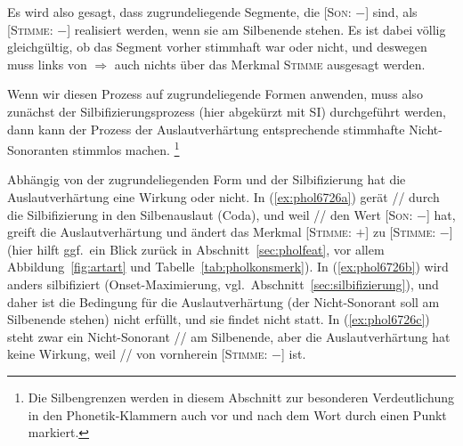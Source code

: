 
Es wird also gesagt, dass zugrundeliegende Segmente, die [\textsc{Son}: $-$] sind, als [\textsc{Stimme}: $-$] realisiert werden, wenn sie am Silbenende stehen.
Es ist dabei völlig gleichgültig, ob das Segment vorher stimmhaft war oder nicht, und deswegen muss links von $\Rightarrow$ auch nichts über das Merkmal \textsc{Stimme} ausgesagt werden.

Wenn wir diesen Prozess auf zugrundeliegende Formen anwenden, muss also zunächst der Silbifizierungsprozess (hier abgekürzt mit SI) durchgeführt werden, dann kann der Prozess der Auslautverhärtung entsprechende stimmhafte Nicht-Sonoranten stimmlos machen.%
\footnote{Die Silbengrenzen werden in diesem Abschnitt zur besonderen Verdeutlichung in den Phonetik-Klammern auch vor und nach dem Wort durch einen Punkt markiert.}

\begin{exe}
  \ex\label{ex:phol6726}
  \begin{xlist}
  \end{xlist}
\end{exe}

Abhängig von der zugrundeliegenden Form und der Silbifizierung hat die Auslautverhärtung eine Wirkung oder nicht.
In (\ref{ex:phol6726a}) gerät // durch die Silbifizierung in den Silbenauslaut (Coda), und weil // den Wert [\textsc{Son}: $-$] hat, greift die Auslautverhärtung und ändert das Merkmal [\textsc{Stimme}: $+$] zu [\textsc{Stimme}: $-$] (hier hilft ggf.\ ein Blick zurück in Abschnitt~\ref{sec:pholfeat}, vor allem Abbildung~\ref{fig:artart} und Tabelle~\ref{tab:pholkonsmerk}).
In (\ref{ex:phol6726b}) wird anders silbifiziert (Onset-Maximierung, vgl.\ Abschnitt~\ref{sec:silbifizierung}), und daher ist die Bedingung für die Auslautverhärtung (der Nicht-Sonorant soll am Silbenende stehen) nicht erfüllt, und sie findet nicht statt.
In (\ref{ex:phol6726c}) steht zwar ein Nicht-Sonorant // am Silbenende, aber die Auslautverhärtung hat keine Wirkung, weil // von vornherein [\textsc{Stimme}: $-$] ist.

